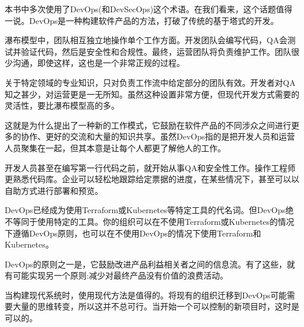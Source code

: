 本书中多次使用了DevOps(和DevSecOps)这个术语。在我们看来，这个话题值得一说。DevOps是一种构建软件产品的方法，打破了传统的基于塔式的开发。

瀑布模型中，团队相互独立地操作单个工作方面。开发团队会编写代码，QA会测试并验证代码，然后是安全性和合规性。最终，运营团队将负责维护工作。团队很少沟通，即使这样，这也是一个非常正规的过程。

关于特定领域的专业知识，只对负责工作流中给定部分的团队有效。开发者对QA知之甚少，对运营更是一无所知。虽然这种设置非常方便，但现代开发方式需要的灵活性，要比瀑布模型高的多。

这就是为什么提出了一种新的工作模式，它鼓励在软件产品的不同涉众之间进行更多的协作、更好的交流和大量的知识共享。虽然DevOps指的是把开发人员和运营人员聚集在一起，但其本意是让每个人都更了解他人的工作。

开发人员甚至在编写第一行代码之前，就开始从事QA和安全性工作。操作工程师更熟悉代码库。企业可以轻松地跟踪给定票据的进度，在某些情况下，甚至可以以自助方式进行部署和预览。

DevOps已经成为使用Terraform或Kubernetes等特定工具的代名词。但DevOps绝不等同于使用特定的工具。你的组织可以在不使用Terraform或Kubernetes的情况下遵循DevOps原则，也可以在不使用DevOps的情况下使用Terraform和Kubernetes。

DevOps的原则之一是，它鼓励改进产品利益相关者之间的信息流。有了这些，就有可能实现另一个原则:减少对最终产品没有价值的浪费活动。

当构建现代系统时，使用现代方法是值得的。将现有的组织迁移到DevOps可能需要大量的思维转变，所以这并不总可行。当开始一个可以控制的新项目时，这时是可以的。